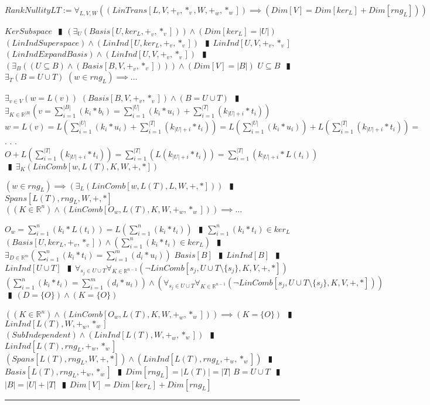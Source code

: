 \documentclass{book}
\newcommand{\abr}{:=}
\newcommand{\cont}{\phantom{.}. . .\phantom{.}}
\newcommand{\pipe}{$\phantom{(}\vrectangleblack\phantom{)}$}
\newcommand{\pr}[1]{\left(#1\right)}
\begin{document}
$RankNullityLT \abr \forall_{L, V, W}\pr{(LinTrans[L, V, +_v, *_v, W, +_w, *_w]) \implies (Dim[V] = Dim[ker_L] + Dim[rng_L])}$
\begin{enumerate}
  \lit $KerSubspace$ \pipe $\pr{\exists_{U}(Basis[U, ker_L, +_v, *_v])} \land (Dim[ker_L] = |U|)$
  \lit $(LinIndSuperspace) \land (LinInd[U, ker_L, +_v, *_v])$ \pipe $LinInd[U, V, +_v, *_v]$
  \lit $(LinIndExpandBasis) \land (LinInd[U, V, +_v, *_v])$ \pipe $\pr{\exists_{B}\pr{(U \subseteq B)\land (Basis[B, V, +_v, *_v])}} \land (Dim[V] = |B|)$
  \lit $U \subseteq B$ \pipe $\exists_{T}(B = U \cup T)$
  \lit $(w \in rng_L) \implies \ldots$
  \begin{enumerate}
    \lit $\exists_{v \in V}\pr{w = L(v)}$
    \lit $(Basis[B, V, +_v, *_v]) \land (B = U \cup T)$ \pipe $\exists_{K \in \mathbb{R}^{|B|}}\pr{v = \sum_{i = 1}^{|B|}(k_i * b_i) = \sum_{i = 1}^{|U|}(k_i * u_i) + \sum_{i = 1}^{|T|}(k_{|U| + i} * t_i)}$
    \lit $w = L(v) = L\pr{\sum_{i = 1}^{|U|}(k_i * u_i) + \sum_{i = 1}^{|T|}(k_{|U| + i} * t_i)} = L\pr{\sum_{i = 1}^{|U|}(k_i * u_i)} + L\pr{\sum_{i = 1}^{|T|}(k_{|U| + i} * t_i)} =$ \cont
    \lit $O + L\pr{\sum_{i = 1}^{|T|}(k_{|U| + i} * t_i)} = \sum_{i = 1}^{|T|}\pr{L(k_{|U| + i} * t_i)} = \sum_{i = 1}^{|T|}\pr{k_{|U| + i} * L(t_i)}$ \pipe $\exists_{K}\pr{LinComb[w, L(T), K, W, +, *]}$
  \end{enumerate}
  \lit $(w \in rng_L) \implies \pr{\exists_{L}\pr{LinComb[w, L(T), L, W, +, *]}}$ \pipe $Spans[L(T), rng_L, W, +, *]$
  \lit $\pr{(K \in \mathbb{R}^n) \land \pr{LinComb[O_w, L(T), K, W, +_w, *_w]}} \implies \ldots$
  \begin{enumerate}
    \lit $O_w = \sum_{i = 1}^{n}\pr{k_i * L(t_i)} = L\pr{\sum_{i = 1}^{n}(k_i * t_i)}$ \pipe $\sum_{i = 1}^{n}(k_i * t_i) \in ker_L$ 
    \lit $(Basis[U, ker_L, +_v, *_v]) \land \pr{\sum_{i = 1}^{n}(k_i * t_i) \in ker_L}$ \pipe $\exists_{D \in \mathbb{R}^m}\pr{\sum_{i = 1}^{n}(k_i * t_i) = \sum_{i = 1}^{m}(d_i * u_i)}$
    \lit $Basis[B]$ \pipe $LinInd[B]$ \pipe $LinInd[U \cup T]$ \pipe $\forall_{s_j \in U \cup T} \forall_{K \in \mathbb{R}^{n - 1}}(\lnot LinComb[s_j, U \cup T \setminus \{s_j\}, K, V, +, *])$
    \lit $\pr{\sum_{i = 1}^{n}(k_i * t_i) = \sum_{i = 1}^{m}(d_i * u_i)} \land \pr{\forall_{s_j \in U \cup T} \forall_{K \in \mathbb{R}^{n - 1}}(\lnot LinComb[s_j, U \cup T \setminus \{s_j\}, K, V, +, *])}$ \pipe $(D = \{O\}) \land (K = \{O\})$
  \end{enumerate}
  \lit $\pr{(K \in \mathbb{R}^n) \land \pr{LinComb[O_w, L(T), K, W, +_w, *_w]}} \implies (K = \{O\})$ \pipe $LinInd[L(T), W, +_w, *_w]$
  \lit $(SubIndependent) \land \pr{LinInd[L(T), W, +_w, *_w]}$ \pipe $LinInd[L(T), rng_L, +_w, *_w]$
  \lit $\pr{Spans[L(T), rng_L, W, +, *]} \land \pr{LinInd[L(T), rng_L, +_w, *_w]}$ \pipe $Basis[L(T), rng_L, +_w, *_w]$ \pipe $Dim[rng_L] = |L(T)| = |T|$
  \lit $B = U \cup T$ \pipe $|B| = |U| + |T|$ \pipe $Dim[V] = Dim[ker_L] + Dim[rng_L]$
\end{enumerate} \vspace{.75mm} \hrule \vspace{.75mm} \ \\ 
\end{document}
